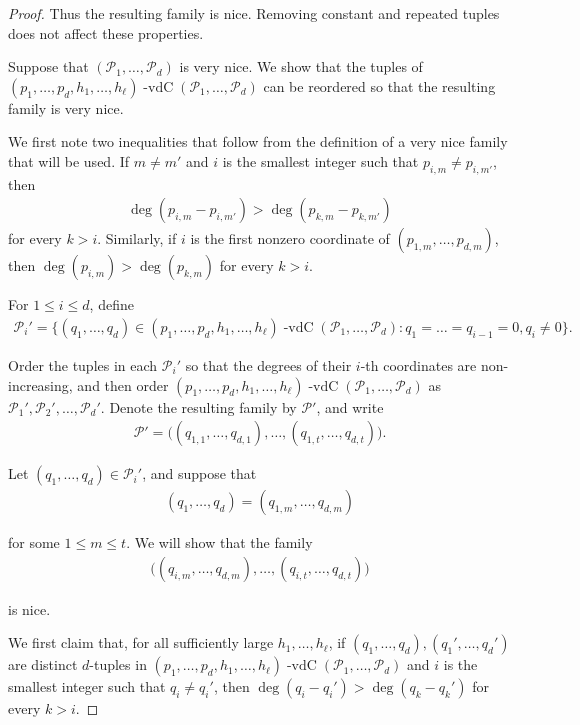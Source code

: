 \documentclass[11pt,reqno]{amsart}
\newcommand{\cP}{{\mathcal P}}
\DeclareMathOperator{\vdc}{-vdC}
\theoremstyle{definition}
\theoremstyle{remark}
\begin{document}
\begin{proof}
Thus the resulting family is nice. Removing constant and repeated tuples does not affect these properties.

Suppose that $(\cP_1,\dots,\cP_d)$ is very nice. We show that the tuples of $(p_1,\ldots,p_d,h_1,\dots,h_\ell) \vdc (\cP_1,\ldots, \cP_d)$ can be reordered so that the resulting family is very nice.

We first note two inequalities that follow from the definition of a very nice family that will be used. If $m\neq m'$ and $i$ is the smallest integer such that $p_{i,m}\neq p_{i,m'}$, then\begin{align*} \deg(p_{i,m}-p_{i,m'})> \deg(p_{k,m}-p_{k,m'}) \end{align*} for every $k>i$. Similarly, if $i$ is the first nonzero coordinate of $(p_{1,m},\dots,p_{d,m})$, then $\deg(p_{i,m})>\deg(p_{k,m})$ for every $k>i$.

For $1\leq i\leq d$, define\begin{align*}
    \cP_i' = \{(q_1,\dots,q_d)\in(p_1,\ldots,p_d,h_1,\dots,h_\ell)\vdc(\cP_1,\ldots, \cP_d): q_1 = \dots=q_{i-1}=0, q_i\neq 0 \}.
\end{align*}

Order the tuples in each $\cP_i'$ so that the degrees of their $i$-th coordinates are non-increasing, and then order $(p_1,\ldots,p_d,h_1,\dots,h_\ell)\vdc(\cP_1,\ldots, \cP_d)$ as $\cP_1',\cP_2',\dots,\cP_d'$. Denote the resulting family by $\cP'$, and write\begin{align*}
    \cP' = \big( (q_{1,1},\dots,q_{d,1}),\dots, (q_{1,t},\dots,q_{d,t}) \big).
\end{align*}

Let $(q_1,\dots,q_d)\in\cP_i'$, and suppose that\begin{align*}
    (q_1,\dots,q_d) =  (q_{1,m},\dots,q_{d,m})
\end{align*}

for some $1\leq m \leq t$. We will show that the family\begin{align*}
    \big( (q_{i,m},\dots,q_{d,m}),\dots,(q_{i,t},\dots,q_{d,t}) \big)
\end{align*}

is nice.

We first claim that, for all sufficiently large $h_1,\ldots,h_\ell$, if $(q_1,\dots,q_d),(q_1',\dots,q_d')$ are distinct $d$-tuples in $(p_1,\ldots,p_d,h_1,\dots,h_\ell)\vdc(\cP_1,\ldots, \cP_d)$ and $i$ is the smallest integer such that $q_i \neq q_i'$, then $\deg(q_i-q_i')>\deg(q_k-q_k')$ for every $k>i$. 


\end{proof}
\end{document}
